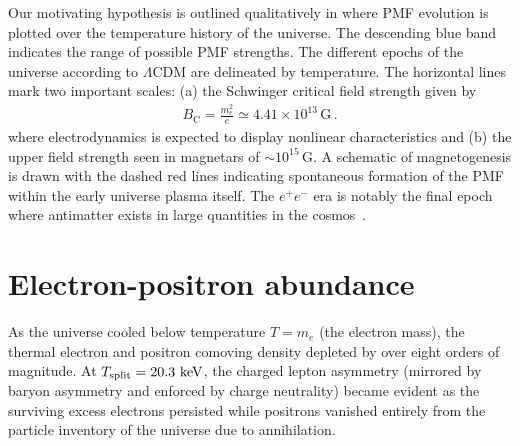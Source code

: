 Our motivating hypothesis is outlined qualitatively in  where PMF evolution is plotted over the temperature history of the universe. The descending blue band indicates the range of possible PMF strengths. The different epochs of the universe according to $\Lambda\mathrm{CDM}$ are delineated by temperature. The horizontal lines mark two important scales: (a) the Schwinger critical field strength given by
\begin{align}
    \label{crit:1}
    B_\mathrm{C} = \frac{m_{e}^{2}}{e}\simeq4.41\times10^{13}\,\mathrm{G}\,.
\end{align}
where electrodynamics is expected to display nonlinear characteristics and (b) the upper field strength seen in magnetars of $\sim10^{15}\,\mathrm{G}$. A schematic of magnetogenesis is drawn with the dashed red lines indicating spontaneous formation of the PMF within the early universe plasma itself. The $e^{+}e^{-}$ era is notably the final epoch where antimatter exists in large quantities in the cosmos~\cite{Rafelski:2023emw}.

\section{Electron-positron abundance}
\label{sec:abundance}
\noindent As the universe cooled below temperature $T\!=\!m_{e}$ (the electron mass), the thermal electron and positron comoving density depleted by over eight orders of magnitude. At $T_\mathrm{split}=20.3\text{ keV}$, the charged lepton asymmetry (mirrored by baryon asymmetry and enforced by charge neutrality) became evident as the surviving excess electrons persisted while positrons vanished entirely from the particle inventory of the universe due to annihilation.

